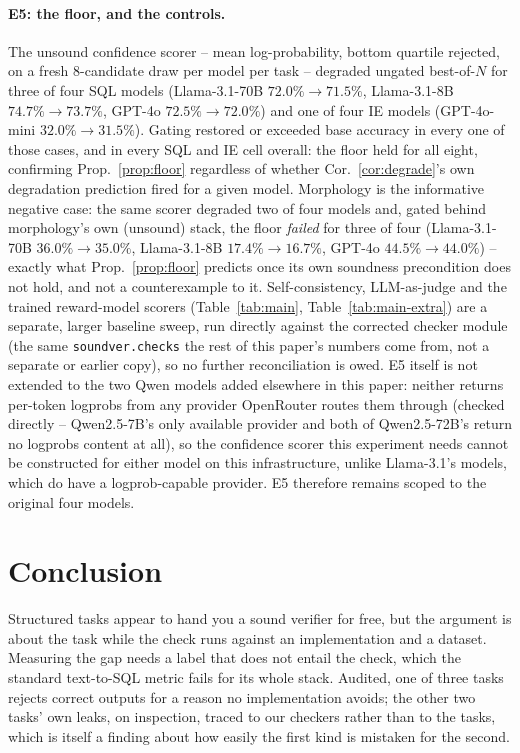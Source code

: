 \documentclass[11pt]{article}
\begin{document}
\paragraph{E5: the floor, and the controls.} The unsound confidence
scorer -- mean log-probability, bottom quartile rejected, on a fresh
8-candidate draw per model per task -- degraded ungated best-of-$N$ for
three of four SQL models (Llama-3.1-70B $72.0\%\to71.5\%$, Llama-3.1-8B
$74.7\%\to73.7\%$, GPT-4o $72.5\%\to72.0\%$) and one of four IE models
(GPT-4o-mini $32.0\%\to31.5\%$). Gating restored or exceeded base accuracy in
every one of those cases, and in every SQL and IE cell overall: the floor
held for all eight, confirming Prop.~\ref{prop:floor} regardless of whether
Cor.~\ref{cor:degrade}'s own degradation prediction fired for a given
model. Morphology is the informative negative case: the same scorer
degraded two of four models and, gated behind morphology's own (unsound)
stack, the floor \emph{failed} for three of four (Llama-3.1-70B
$36.0\%\to35.0\%$, Llama-3.1-8B $17.4\%\to16.7\%$, GPT-4o
$44.5\%\to44.0\%$) -- exactly what Prop.~\ref{prop:floor} predicts once its
own soundness precondition does not hold, and not a counterexample to it.
Self-consistency, LLM-as-judge and the trained reward-model scorers
(Table~\ref{tab:main}, Table~\ref{tab:main-extra}) are a separate,
larger baseline sweep, run directly against the corrected checker module
(the same \texttt{soundver.checks} the rest of this paper's numbers
come from, not a separate or earlier copy), so no further reconciliation
is owed. E5 itself is not extended to the two Qwen models added
elsewhere in this paper: neither returns per-token logprobs from any
provider OpenRouter routes them through (checked directly --
Qwen2.5-7B's only available provider and both of Qwen2.5-72B's return
no logprobs content at all), so the confidence scorer this experiment
needs cannot be constructed for either model on this infrastructure,
unlike Llama-3.1's models, which do have a logprob-capable provider.
E5 therefore remains scoped to the original four models.

\section{Conclusion}
Structured tasks appear to hand you a sound verifier for free, but the argument
is about the task while the check runs against an implementation and a dataset.
Measuring the gap needs a label that does not entail the check, which the
standard text-to-SQL metric fails for its whole stack. Audited, one of three
tasks rejects correct outputs for a reason no implementation avoids; the other
two tasks' own leaks, on inspection, traced to our checkers rather than to the
tasks, which is itself a finding about how easily the first kind is mistaken
for the second.
\end{document}
